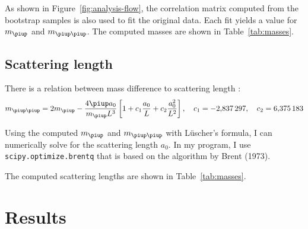 \documentclass[11pt, english, fleqn, DIV=15, headinclude]{scrartcl}
\newcommand\mpi{m_{\piup}}
\newcommand\mpipi{m_{\piup\piup}}
\begin{document}
As shown in Figure~\ref{fig:analysis-flow}, the correlation matrix computed from
the bootstrap samples is also used to fit the original data. Each fit yields a
value for $\mpi$ and $\mpipi$. The computed masses are shown in
Table~\ref{tab:masses}.

\subsection{Scattering length}
\label{sec:scattering_length}

There is a relation between mass difference to scattering length
\parencite[(1.3)]{luescher/volume_dependence}:
\begin{equation}
    \label{eq:luescher}
    \mpipi = 2\mpi - \frac{4 \piup a_0}{\mpi L^3} \sbr{1 + c_1 \frac{a_0}L + c_2 \frac{a_0^2}{L^2}}
    \eqnsep
    c_1 = \num{-2.837297}
    \eqnsep
    c_2 = \num{6.375183}
\end{equation}

Using the computed $\mpi$ and $\mpipi$ with Lüscher's formula, I can
numerically solve for the scattering length $a_0$. In my program, I use
\texttt{scipy.optimize.brentq} that is based on the algorithm by Brent (1973).

The computed scattering lengths are shown in Table~\ref{tab:masses}.

\section{Results}
\label{sec:results}
\end{document}
